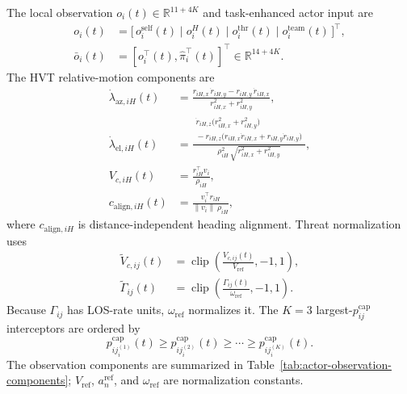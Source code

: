 \documentclass[unbranded]{cja}
\begin{document}
The local observation $o_i(t)\in\mathbb R^{11+4K}$ and task-enhanced actor input are
\begin{equation}
\begin{aligned}
o_i(t)
&=\bigl[\,o_i^{\mathrm{self}}(t)\mid o_i^{H}(t)\mid
o_i^{\mathrm{thr}}(t)\mid o_i^{\mathrm{team}}(t)\,\bigr]^\top,\\
\bar o_i(t)
&=\left[o_i^\top(t),\hat{\pi}_i^\top(t)\right]^\top
\in\mathbb R^{14+4K}.
\end{aligned}
\label{eq:obs-decomp}
\end{equation}
The HVT relative-motion components are
\begin{align}
\dot\lambda_{\mathrm{az},iH}(t)&=\frac{r_{iH,x}\,\dot r_{iH,y}-r_{iH,y}\,\dot r_{iH,x}}{r_{iH,x}^{2}+r_{iH,y}^{2}},
\label{eq:los-az}\\
\dot\lambda_{\mathrm{el},iH}(t)&=\frac{\begin{gathered}
\dot r_{iH,z}\bigl(r_{iH,x}^{2}+r_{iH,y}^{2}\bigr)\\
{}-r_{iH,z}\bigl(r_{iH,x}\dot r_{iH,x}+r_{iH,y}\dot r_{iH,y}\bigr)
\end{gathered}}{\rho_{iH}^{2}\,\sqrt{r_{iH,x}^{2}+r_{iH,y}^{2}}},
\label{eq:los-el}\\
V_{c,iH}(t)&=\frac{r_{iH}^{\top}v_i}{\rho_{iH}},
\label{eq:vc-h}\\
c_{\mathrm{align},iH}(t)&=\frac{v_i^{\top}r_{iH}}{\|v_i\|\,\rho_{iH}},
\label{eq:cos-align}
\end{align}
where $c_{\mathrm{align},iH}$ is distance-independent heading alignment. Threat normalization uses
\begin{equation}
\begin{aligned}
\widetilde V_{c,ij}(t)
&=\operatorname{clip}\!\left(\frac{V_{c,ij}(t)}{V_{\mathrm{ref}}},-1,1\right),\\
\widetilde\Gamma_{ij}(t)
&=\operatorname{clip}\!\left(\frac{\Gamma_{ij}(t)}{\omega_{\mathrm{ref}}},-1,1\right).
\end{aligned}
\end{equation}
Because $\Gamma_{ij}$ has LOS-rate units, $\omega_{\mathrm{ref}}$ normalizes it. The $K=3$ largest-$p_{ij}^{\mathrm{cap}}$ interceptors are ordered by
\begin{equation}
p_{i j_i^{(1)}}^{\mathrm{cap}}(t)
\ge p_{i j_i^{(2)}}^{\mathrm{cap}}(t)
\ge\cdots\ge
p_{i j_i^{(K)}}^{\mathrm{cap}}(t).
\end{equation}
The observation components are summarized in Table~\ref{tab:actor-observation-components}; $V_{\mathrm{ref}}$, $a^{\mathrm{ref}}_n$, and $\omega_{\mathrm{ref}}$ are normalization constants.
\end{document}
